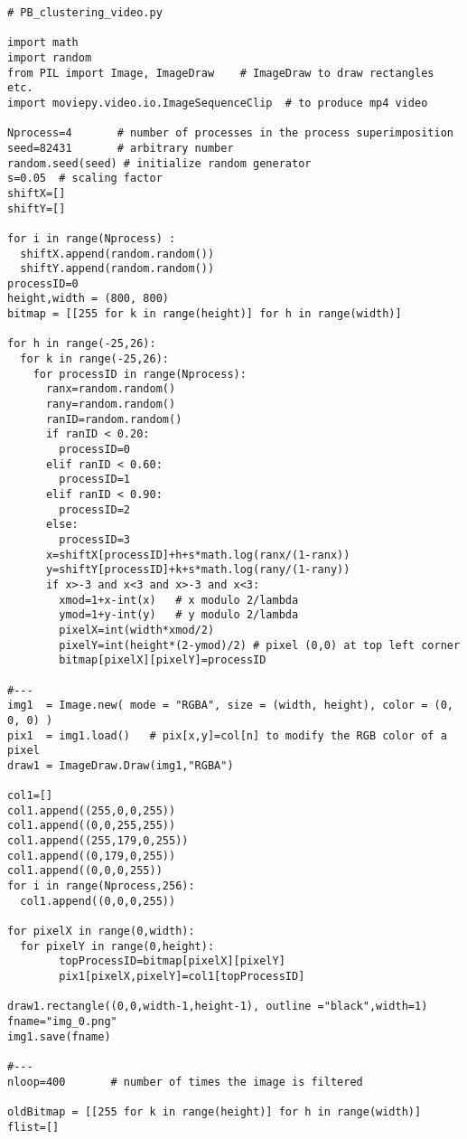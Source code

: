 \documentclass[oneside,10pt]{book}
\begin{document}
\begin{lstlisting}
# PB_clustering_video.py

import math
import random
from PIL import Image, ImageDraw    # ImageDraw to draw rectangles etc.
import moviepy.video.io.ImageSequenceClip  # to produce mp4 video

Nprocess=4       # number of processes in the process superimposition
seed=82431       # arbitrary number
random.seed(seed) # initialize random generator 
s=0.05  # scaling factor
shiftX=[]
shiftY=[]

for i in range(Nprocess) :
  shiftX.append(random.random())
  shiftY.append(random.random())
processID=0
height,width = (800, 800)
bitmap = [[255 for k in range(height)] for h in range(width)]

for h in range(-25,26):   
  for k in range(-25,26):  
    for processID in range(Nprocess): 
      ranx=random.random()
      rany=random.random()
      ranID=random.random()
      if ranID < 0.20:
        processID=0
      elif ranID < 0.60:
        processID=1
      elif ranID < 0.90:
        processID=2 
      else:
        processID=3
      x=shiftX[processID]+h+s*math.log(ranx/(1-ranx)) 
      y=shiftY[processID]+k+s*math.log(rany/(1-rany))
      if x>-3 and x<3 and x>-3 and x<3:
        xmod=1+x-int(x)   # x modulo 2/lambda
        ymod=1+y-int(y)   # y modulo 2/lambda
        pixelX=int(width*xmod/2)   
        pixelY=int(height*(2-ymod)/2) # pixel (0,0) at top left corner
        bitmap[pixelX][pixelY]=processID

#---
img1  = Image.new( mode = "RGBA", size = (width, height), color = (0, 0, 0) )
pix1  = img1.load()   # pix[x,y]=col[n] to modify the RGB color of a pixel
draw1 = ImageDraw.Draw(img1,"RGBA")

col1=[] 
col1.append((255,0,0,255))
col1.append((0,0,255,255))
col1.append((255,179,0,255))
col1.append((0,179,0,255))
col1.append((0,0,0,255))
for i in range(Nprocess,256):
  col1.append((0,0,0,255))
 
for pixelX in range(0,width): 
  for pixelY in range(0,height): 
        topProcessID=bitmap[pixelX][pixelY]
        pix1[pixelX,pixelY]=col1[topProcessID]

draw1.rectangle((0,0,width-1,height-1), outline ="black",width=1)
fname="img_0.png"
img1.save(fname)

#---
nloop=400       # number of times the image is filtered 

oldBitmap = [[255 for k in range(height)] for h in range(width)]
flist=[]


\end{lstlisting}
\end{document}
